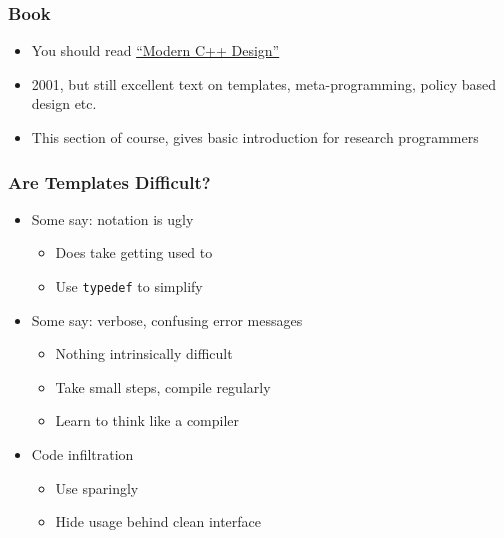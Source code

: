 \subsubsection{Book}\label{book}

\begin{itemize}
\itemsep1pt\parskip0pt
\item
  You should read
  \href{http://erdani.com/index.php/books/modern-c-design/}{``Modern C++
  Design''}
\item
  2001, but still excellent text on templates, meta-programming, policy
  based design etc.
\item
  This section of course, gives basic introduction for research
  programmers
\end{itemize}

\subsubsection{Are Templates Difficult?}\label{are-templates-difficult}

\begin{itemize}
\itemsep1pt\parskip0pt
\item
  Some say: notation is ugly

  \begin{itemize}
  \itemsep1pt\parskip0pt
  \item
    Does take getting used to
  \item
    Use \texttt{typedef} to simplify
  \end{itemize}
\item
  Some say: verbose, confusing error messages

  \begin{itemize}
  \itemsep1pt\parskip0pt
  \item
    Nothing intrinsically difficult
  \item
    Take small steps, compile regularly
  \item
    Learn to think like a compiler
  \end{itemize}
\item
  Code infiltration

  \begin{itemize}
  \itemsep1pt\parskip0pt
  \item
    Use sparingly
  \item
    Hide usage behind clean interface
  \end{itemize}
\end{itemize}

